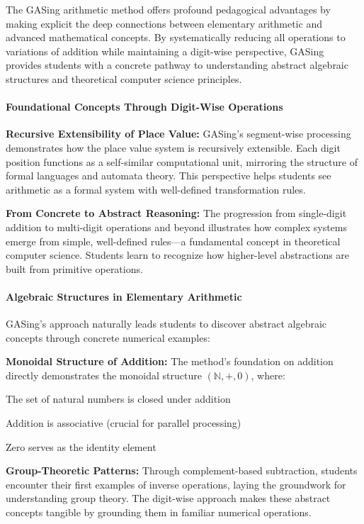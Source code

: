 The GASing arithmetic method offers profound pedagogical advantages by making explicit the deep connections between elementary arithmetic and advanced mathematical concepts. By systematically reducing all operations to variations of addition while maintaining a digit-wise perspective, GASing provides students with a concrete pathway to understanding abstract algebraic structures and theoretical computer science principles.
\paragraph{Foundational Concepts Through Digit-Wise Operations}


\noindent\textbf{\textbf{Recursive Extensibility of Place Value}:} GASing's segment-wise processing demonstrates how the place value system is recursively extensible. Each digit position functions as a self-similar computational unit, mirroring the structure of formal languages and automata theory. This perspective helps students see arithmetic as a formal system with well-defined transformation rules.



\noindent\textbf{\textbf{From Concrete to Abstract Reasoning}:} The progression from single-digit addition to multi-digit operations and beyond illustrates how complex systems emerge from simple, well-defined rules—a fundamental concept in theoretical computer science. Students learn to recognize how higher-level abstractions are built from primitive operations.

\paragraph{Algebraic Structures in Elementary Arithmetic}

GASing's approach naturally leads students to discover abstract algebraic concepts through concrete numerical examples:


\noindent\textbf{\textbf{Monoidal Structure of Addition}:} The method's foundation on addition directly demonstrates the monoidal structure $(\mathbb{N}, +, 0)$, where:


\noindent The set of natural numbers is closed under addition


\noindent Addition is associative (crucial for parallel processing)


\noindent Zero serves as the identity element



\noindent\textbf{\textbf{Group-Theoretic Patterns}:} Through complement-based subtraction, students encounter their first examples of inverse operations, laying the groundwork for understanding group theory. The digit-wise approach makes these abstract concepts tangible by grounding them in familiar numerical operations.

